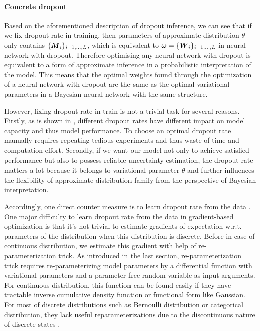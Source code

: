 \paragraph{Concrete dropout} 
Based on the aforementioned description of dropout inference, we can see that if we fix dropout rate in training, then parameters of approximate distribution $\theta$ only contains $\{\boldsymbol M_{i}\}_{i=1,...,L}$, which is equivalent to $\boldsymbol \omega = \{\boldsymbol W_{i}\}_{i=1,...,L}$ in neural network with dropout. Therefore optimising any neural network with dropout is equivalent to a form of approximate inference in a probabilistic interpretation of the model. This means that the optimal weights found through the optimization of a neural network with dropout are the same as the optimal variational parameters in a Bayesian neural network with the same structure. 

However, fixing dropout rate in train is not a trivial task for several reasons. Firstly, as is shown in \cite{srivastava2014dropout}, different dropout rates have different impact on model capacity and thus model performance. To choose an optimal dropout rate manually requires repeating tedious experiments and thus waste of time and computation effort. Secondly, if we want our model not only to achieve satisfied performance but also to possess reliable uncertainty estimation, the dropout rate matters a lot because it belongs to variational parameter $\theta$ and further influences the flexibility of approximate distribution family from the perspective of Bayesian interpretation.

Accordingly, one direct counter measure is to learn dropout rate from the data \cite{gal2017concrete}. One major difficulty to learn dropout rate from the data in gradient-based optimization is that it's not trivial to estimate gradients of expectation w.r.t. parameters of the distribution when this distribution is discrete. Before in case of continuous distribution, we estimate this gradient with help of re-parameterization trick. As introduced in the last section, re-parameterization trick requires re-parameterizing model parameters by a differential function with variational parameters and a parameter-free random variable as input arguments. For continuous distribution, this function can be found easily if they have tractable inverse cumulative density function or functional form like Gaussian\cite{kingma2013auto}. For most of discrete distributions such as Bernoulli distribution or categorical distribution, they lack useful reparameterizations
due to the discontinuous nature of discrete states \cite{maddison2016concrete}. 

